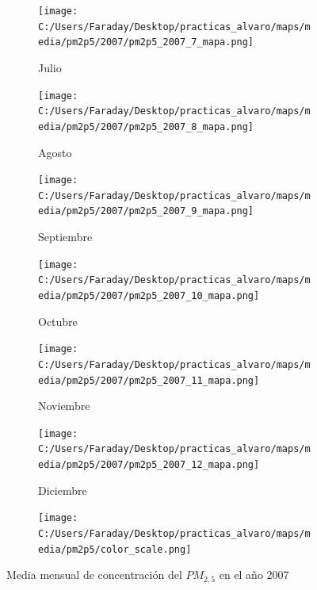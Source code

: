 \documentclass[12pt]{article}
\begin{document}
\begin{figure}[H]
\begin{subfigure}[H]{0.15\textwidth}
\texttt{[image: C:/Users/Faraday/Desktop/practicas\_alvaro/maps/media/pm2p5/2007/pm2p5\_2007\_7\_mapa.png]}
\captionsetup{labelformat=empty}
\caption{Julio}
\label{fig:map-pm2p5-2007-7}
\end{subfigure}
%
\begin{subfigure}[H]{0.15\textwidth}
\texttt{[image: C:/Users/Faraday/Desktop/practicas\_alvaro/maps/media/pm2p5/2007/pm2p5\_2007\_8\_mapa.png]}
\captionsetup{labelformat=empty}
\caption{Agosto}
\label{fig:map-pm2p5-2007-8}
\end{subfigure}
%
\begin{subfigure}[H]{0.15\textwidth}
\texttt{[image: C:/Users/Faraday/Desktop/practicas\_alvaro/maps/media/pm2p5/2007/pm2p5\_2007\_9\_mapa.png]}
\captionsetup{labelformat=empty}
\caption{Septiembre}
\label{fig:map-pm2p5-2007-9}
\end{subfigure}
%
\begin{subfigure}[H]{0.15\textwidth}
\texttt{[image: C:/Users/Faraday/Desktop/practicas\_alvaro/maps/media/pm2p5/2007/pm2p5\_2007\_10\_mapa.png]}
\captionsetup{labelformat=empty}
\caption{Octubre}
\label{fig:map-pm2p5-2007-10}
\end{subfigure}
%
\begin{subfigure}[H]{0.15\textwidth}
\texttt{[image: C:/Users/Faraday/Desktop/practicas\_alvaro/maps/media/pm2p5/2007/pm2p5\_2007\_11\_mapa.png]}
\captionsetup{labelformat=empty}
\caption{Noviembre}
\label{fig:map-pm2p5-2007-11}
\end{subfigure}
%
\begin{subfigure}[H]{0.15\textwidth}
\texttt{[image: C:/Users/Faraday/Desktop/practicas\_alvaro/maps/media/pm2p5/2007/pm2p5\_2007\_12\_mapa.png]}
\captionsetup{labelformat=empty}
\caption{Diciembre}
\label{fig:map-pm2p5-2007-12}
\end{subfigure}

\begin{subfigure}[H]{0.45\textwidth}
\texttt{[image: C:/Users/Faraday/Desktop/practicas\_alvaro/maps/media/pm2p5/color\_scale.png]}
\captionsetup{labelformat=empty}
\caption{}
\end{subfigure}

\vspace*{-7mm}
\caption{Media mensual de concentración del $PM_{2,5}$ en el año 2007}
\label{fig:map-pm2p5-2007}
\end{figure}
\end{document}
